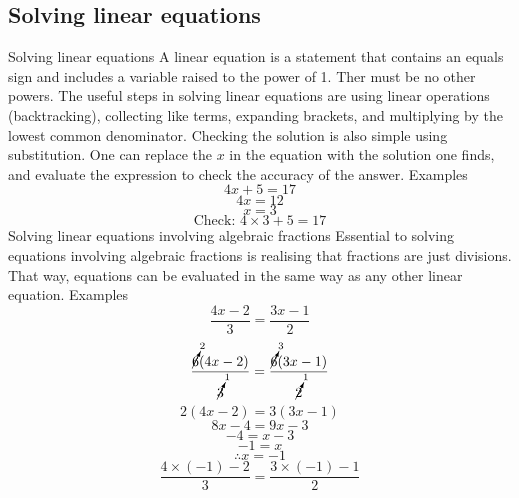 \begin{outline}
\subsection{Solving linear equations}
	\1 Solving linear equations
		\2 A linear equation is a statement that contains an equals sign and includes a variable raised to the power of 1. Ther must be no other powers. The useful steps in solving linear equations are using linear operations (backtracking), collecting like terms, expanding brackets, and multiplying by the lowest common denominator. Checking the solution is also simple using substitution. One can replace the $x$ in the equation with the solution one finds, and evaluate the expression to check the accuracy of the answer.
			\3 Examples
				\[4x+5=17\]
				\[4x = 12\]
				\[x = 3\]
				\[\text{Check: } 4\times 3 + 5 = 17\]
	\1 Solving linear equations involving algebraic fractions
		\2 Essential to solving equations involving algebraic fractions is realising that fractions are just divisions. That way, equations can be evaluated in the same way as any other linear equation.
			\3 Examples
				\[\frac{4x-2}{3}=\frac{3x-1}{2}\]
				\[\frac{\cancelto{2}{6}(4x-2)}{\cancelto{1}{3}} = \frac{\cancelto{3}{6}(3x-1)}{\cancelto{1}{2}}\]
				\[2(4x-2)=3(3x-1)\]
				\[8x-4=9x-3\]
				\[-4=x-3\]
				\[-1=x\]
				\[\therefore x = -1\]
				\[\frac{4\times(-1)-2}{3}=\frac{3\times(-1)-1}{2}\]

\0				

\end{outline}
